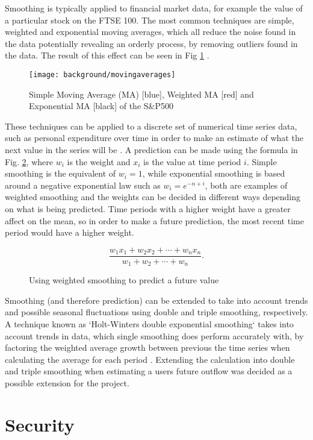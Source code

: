 Smoothing is typically applied to financial market data, for example the value of a particular stock on the FTSE 100. The most common techniques are simple, weighted and exponential moving averages, which all reduce the noise found in the data potentially revealing an orderly process, by removing outliers found in the data. The result of this effect can be seen in Fig \ref{fig:dashweightedaverages} \parencite{dash2012movingaverages}.

\begin{figure}[h]
    \centering
    \texttt{[image: background/movingaverages]}
    \caption[SMA, WMA and EMA of the S\&P500]{Simple Moving Average (MA) [blue], Weighted MA [red] and Exponential MA [black] of the S\&P500 \protect\footnotemark \parencite[Fig. 5]{dash2012movingaverages}}
    \label{fig:dashweightedaverages}
\end{figure}

These techniques can be applied to a discrete set of numerical time series data, such as personal expenditure over time in order to make an estimate of what the next value in the series will be \parencite{filliben2003nist}. A prediction can be made using the formula in Fig. \ref{fig:weightedmeanforumla}, where $w_{i}$ is the weight and $x_i$ is the value at time period $i$. Simple smoothing is the equivalent of $w_i = 1$, while exponential smoothing is based around a negative exponential law such as $w_i = e^{-n+i}$, both are examples of weighted smoothing and the weights can be decided in different ways depending on what is being predicted. Time periods with a higher weight have a greater affect on the mean, so in order to make a future prediction, the most recent time period would have a higher weight. 

\begin{figure}[h]
    \centering
    \[
        \frac{w_1 x_1 + w_2 x_2 + \cdots + w_n x_n}{w_1 + w_2 + \cdots + w_n}.
    \]
    \caption{Using weighted smoothing to predict a future value}
    \label{fig:weightedmeanforumla}
\end{figure}

Smoothing (and therefore prediction) can be extended to take into account trends and possible seasonal fluctuations using double and triple smoothing, respectively. A technique known as `Holt-Winters double exponential smoothing` takes into account trends in data, which single smoothing does perform accurately with, by factoring the weighted average growth between previous the time series when calculating the average for each period \parencite{kalekar2004holtwinters}. 
% 
Extending the calculation into double and triple smoothing when estimating a users future outflow was decided as a possible extension for the project.  

\section{Security}


